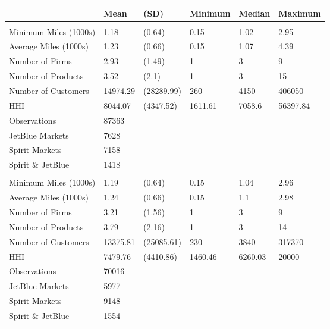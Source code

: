 
\begin{tabular}[t]{llllll}
\toprule
 & Mean & (SD) & Minimum & Median & Maximum\\
\midrule
\addlinespace[0.3em]
\multicolumn{6}{l}{\textbf{Pre-Pandemic}}\\
\hspace{1em}Minimum Miles (1000s) & 1.18 & (0.64) & 0.15 & 1.02 & 2.95\\
\hspace{1em}Average Miles (1000s) & 1.23 & (0.66) & 0.15 & 1.07 & 4.39\\
\hspace{1em}Number of Firms & 2.93 & (1.49) & 1 & 3 & 9\\
\hspace{1em}Number of Products & 3.52 & (2.1) & 1 & 3 & 15\\
\hspace{1em}Number of Customers & 14974.29 & (28289.99) & 260 & 4150 & 406050\\
\hspace{1em}HHI & 8044.07 & (4347.52) & 1611.61 & 7058.6 & 56397.84\\
\hspace{1em}Observations & 87363 &  &  &  & \\
\hspace{1em}JetBlue Markets & 7628 &  &  &  & \\
\hspace{1em}Spirit Markets & 7158 &  &  &  & \\
\hspace{1em}Spirit \& JetBlue & 1418 &  &  &  & \\
\addlinespace[0.3em]
\multicolumn{6}{l}{\textbf{Post-Pandemic}}\\
\hspace{1em}Minimum Miles (1000s) & 1.19 & (0.64) & 0.15 & 1.04 & 2.96\\
\hspace{1em}Average Miles (1000s) & 1.24 & (0.66) & 0.15 & 1.1 & 2.98\\
\hspace{1em}Number of Firms & 3.21 & (1.56) & 1 & 3 & 9\\
\hspace{1em}Number of Products & 3.79 & (2.16) & 1 & 3 & 14\\
\hspace{1em}Number of Customers & 13375.81 & (25085.61) & 230 & 3840 & 317370\\
\hspace{1em}HHI & 7479.76 & (4410.86) & 1460.46 & 6260.03 & 20000\\
\hspace{1em}Observations & 70016 &  &  &  & \\
\hspace{1em}JetBlue Markets & 5977 &  &  &  & \\
\hspace{1em}Spirit Markets & 9148 &  &  &  & \\
\hspace{1em}Spirit \& JetBlue & 1554 &  &  &  & \\
\bottomrule
\end{tabular}

